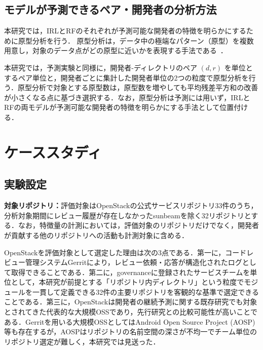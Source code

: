 \documentclass[submit,noauthor,ses,dvipdfmx]{ipsj}
\newcommand{\fixstart}{\color{magenta}}
\newcommand{\fixend}{\color{black}}
\begin{document}
\subsection{モデルが予測できるペア・開発者の分析方法}

本研究では，IRLとRFのそれぞれが予測可能な開発者の特徴を明らかにするために原型分析を行う．
原型分析は，データ中の極端なパターン（原型）を複数用意し，対象のデータ点がどの原型に近いかを表現する手法である~\cite{cutler_breiman}．

本研究では，予測実験と同様に，開発者-ディレクトリのペア $(d, r)$ を単位とするペア単位と，開発者ごとに集計した開発者単位の2つの粒度で原型分析を行う．原型分析で対象とする原型数は，原型数を増やしても平均残差平方和の改善が小さくなる点に基づき選択する．なお，原型分析は予測には用いず，IRLとRFの両モデルが予測可能な開発者の特徴を明らかにする手法として位置付ける．




\section{ケーススタディ}\label{sec:case}

\subsection{実験設定}

\noindent\textbf{対象リポジトリ：}評価対象はOpenStackの公式サービスリポジトリ33件のうち，分析対象期間にレビュー履歴が存在しなかったsunbeamを除く32リポジトリとする．なお，特徴量の計測においては，評価対象のリポジトリだけでなく，開発者が貢献する他のリポジトリへの活動も計測対象に含める．

\fixstart
OpenStackを評価対象として選定した理由は次の3点である．第一に，コードレビュー管理システムGerritにより，レビュー依頼・応答が構造化されたログとして取得できることである．第二に，governanceに登録されたサービスチームを単位として，本研究が前提とする「リポジトリ内ディレクトリ」という粒度でモジュールを一貫して定義できる32件の主要リポジトリを客観的な基準で選定できることである．第三に，OpenStackは開発者の継続予測に関する既存研究\cite{zhou}\cite{bao}\cite{constantinou}でも対象とされてきた代表的な大規模OSSであり，先行研究との比較可能性が高いことである．Gerritを用いる大規模OSSとしてはAndroid Open Source Project (AOSP) 等も存在するが，AOSPはリポジトリの名前空間の深さが不均一でチーム単位のリポジトリ選定が難しく，本研究では見送った．
\fixend
\end{document}
